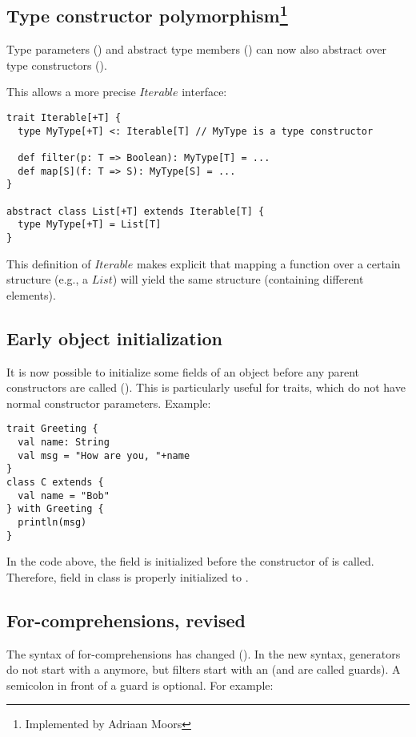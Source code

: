 \subsection*{Type constructor polymorphism\footnote{Implemented by Adriaan Moors}}
Type parameters () and abstract type members () can now also abstract over type constructors ().

This allows a more precise $Iterable$ interface:
\begin{lstlisting}
trait Iterable[+T] {
  type MyType[+T] <: Iterable[T] // MyType is a type constructor

  def filter(p: T => Boolean): MyType[T] = ...
  def map[S](f: T => S): MyType[S] = ...
}

abstract class List[+T] extends Iterable[T] {
  type MyType[+T] = List[T]
}
\end{lstlisting}

This definition of $Iterable$ makes explicit that mapping a function over a certain structure (e.g., a $List$) will yield the same structure (containing different elements).

\subsection*{Early object initialization}

It is now possible to initialize some fields of an object before any
parent constructors are called (). This is particularly useful for
traits, which do not have normal constructor parameters. Example:
\begin{lstlisting}
trait Greeting {
  val name: String
  val msg = "How are you, "+name
}
class C extends {
  val name = "Bob"
} with Greeting {
  println(msg)
}
\end{lstlisting}
In the code above, the field  is initialized before the
constructor of  is called. Therefore, field \lstinline@msg@ in
class  is properly initialized to .

\subsection*{For-comprehensions, revised}

The syntax of for-comprehensions has changed
(). In the new syntax, generators do not
start with a  anymore, but filters start with an 
(and are called guards). A semicolon in front of a guard is optional.
For example:

